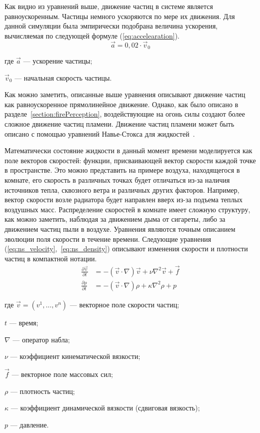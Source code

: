 Как видно из уравнений выше, движение частиц в системе является равноускоренным.
Частицы немного ускоряются по мере их движения. Для данной симуляции была
эмпирически подобрана величина ускорения, вычисляемая по следующей формуле
(\ref{eq:accelearation}).
\begin{equation}
  \label{eq:accelearation}
  \vec{a} = 0,02 \cdot \vec{v}_{0}
\end{equation}
\begin{explanationx}
    \item [где] $\vec{a}$ --- ускорение частицы;
    \item $\vec{v}_{0}$ --- начальная скорость частицы.
\end{explanationx}

Как можно заметить, описанные выше уравнения описывают движение частиц как
равноускоренное прямолинейное движение. Однако, как было описано в
разделе~\ref{section:firePerception}, воздействующие на огонь силы создают более
сложное движение частиц пламени. Движение частиц пламени может быть описано с
помощью уравнений Навье-Стокса для жидкостей~\cite{ForGames}.

Математически состояние жидкости в данный момент времени моделируется как поле
векторов скоростей: функции, присваивающей вектор скорости каждой точке в
пространстве. Это можно представить на примере воздуха, находящегося в комнате,
его скорость в различных точках будет отличаться из-за наличия источников тепла,
сквозного ветра и различных других факторов. Например, вектор скорости возле
радиатора будет направлен вверх из-за подъема теплых воздушных масс.
Распределение скоростей в комнате имеет сложную структуру, как можно заметить,
наблюдая за движением дыма от сигареты, либо за движением частиц пыли в воздухе.
Уравнения являются точным описанием эволюции поля скорости в течение времени.
Следующие уравнения (\ref{eq:ns_velocity},~\ref{eq:ns_density}) описывают
изменения скорости и плотности частиц в компактной нотации.
\begin{align}
    \label{eq:ns_velocity}
    \frac{\partial{\vec{v}}}{\partial{t}} &= -(\vec{v} \cdot \nabla)\vec{v} + \nu \nabla ^ 2 \vec{v} + \vec{f} \\
    \label{eq:ns_density}
    \frac{\partial{\rho}}{\partial{t}} &= -(\vec{v} \cdot \nabla)\rho + \kappa \nabla ^ 2 \rho + p
\end{align}
\begin{explanationx}
    \item [где] $\vec{v} = (v ^ 1, \ldots, v ^ n)$ --- векторное поле скорости
        частиц;
    \item $t$ --- время;
    \item $\nabla$ --- оператор набла;
    \item $\nu$ --- коэффициент кинематической вязкости;
    \item $\vec{f}$ --- векторное поле массовых сил;
    \item $\rho$ --- плотность частиц;
    \item $\kappa$ --- коэффициент динамической вязкости (сдвиговая вязкость);
    \item $p$ --- давление.
\end{explanationx}

